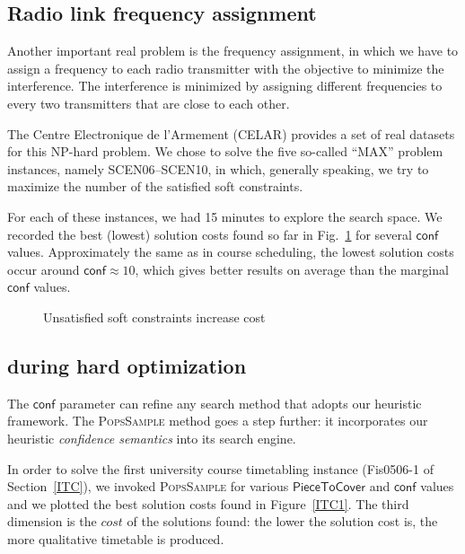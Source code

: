\documentclass{ws-ijait}
\begin{document}
\subsection{Radio link frequency assignment}

Another important real problem is the frequency assignment,
in which we have to assign a frequency to each radio
transmitter with the objective to minimize the interference.
The interference is minimized by assigning different
frequencies to every two transmitters that are close to each
other.

The Centre Electronique de l'Armement (CELAR) provides a set
of real datasets for this NP-hard problem.\cite{radio-link}
We chose to solve the five so-called ``MAX'' problem
instances, namely \textsf{SCEN06}--\textsf{SCEN10}, in
which, generally speaking, we try to maximize the number of
the satisfied soft constraints.

For each of these instances, we had 15 minutes to explore
the search space. We recorded the best (lowest) solution
costs found so far in Fig.~\ref{CELAR} for several
$\mathsf{conf}$ values. Approximately the same as in course
scheduling, the lowest solution costs occur around
$\mathsf{conf} \approx 10$, which gives better results on
average than the marginal $\mathsf{conf}$ values.

\begin{figure}
  \centering
  
  \caption{Unsatisfied soft constraints increase
           cost\label{CELAR}}
\end{figure}

\subsection{\PopsSample{} during hard
            optimization\label{PoPS}}

The $\mathsf{conf}$ parameter can refine any search method
that adopts our heuristic framework. The \textsc{PopsSample}
method goes a step further: it incorporates our heuristic
\emph{confidence semantics} into its search engine.

In order to solve the first university course timetabling
instance (\textsf{Fis0506-1} of Section~\ref{ITC}), we
invoked \textsc{PopsSample} for various
$\mathsf{PieceToCover}$ and $\mathsf{conf}$ values and we
plotted the best solution costs found in Figure~\ref{ITC1}.
The third dimension is the $cost$ of the solutions found:
the lower the solution cost is, the more qualitative
timetable is produced.
\end{document}
